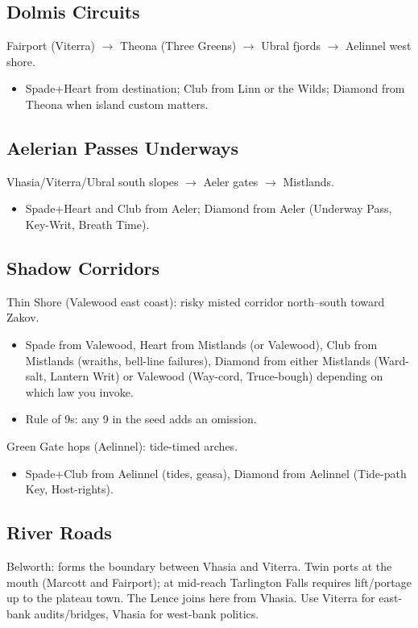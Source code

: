\subsection{Dolmis Circuits}
Fairport (Viterra) $\rightarrow$ Theona (Three Greens) $\rightarrow$ Ubral fjords $\rightarrow$ Aelinnel west shore.

\begin{itemize}
\item Spade+Heart from destination; Club from Linn or the Wilds; Diamond from Theona when island custom matters.
\end{itemize}

\subsection{Aelerian Passes Underways}
Vhasia/Viterra/Ubral south slopes $\rightarrow$ Aeler gates $\rightarrow$ Mistlands.

\begin{itemize}
\item Spade+Heart and Club from Aeler; Diamond from Aeler (Underway Pass, Key-Writ, Breath Time).
\end{itemize}

\subsection{Shadow Corridors}
Thin Shore (Valewood east coast): risky misted corridor north--south toward Zakov.

\begin{itemize}
\item Spade from Valewood, Heart from Mistlands (or Valewood), Club from Mistlands (wraiths, bell-line failures), Diamond from either Mistlands (Ward-salt, Lantern Writ) or Valewood (Way-cord, Truce-bough) depending on which law you invoke.
\item Rule of 9s: any 9 in the seed adds an omission.
\end{itemize}

Green Gate hops (Aelinnel): tide-timed arches.

\begin{itemize}
\item Spade+Club from Aelinnel (tides, geasa), Diamond from Aelinnel (Tide-path Key, Host-rights).
\end{itemize}

\subsection{River Roads}
Belworth: forms the boundary between Vhasia and Viterra. Twin ports at the mouth (Marcott and Fairport); at mid-reach Tarlington Falls requires lift/portage up to the plateau town. The Lence joins here from Vhasia. Use Viterra for east-bank audits/bridges, Vhasia for west-bank politics.

